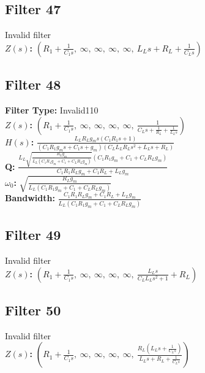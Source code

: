 \documentclass{article}
\begin{document}
\subsection*{Filter 47}
Invalid filter \\ 
\textbf{$Z(s)$:} $\left( R_{1} + \frac{1}{C_{1} s}, \  \infty, \  \infty, \  \infty, \  \infty, \  L_{L} s + R_{L} + \frac{1}{C_{L} s}\right)$ \\ 
\subsection*{Filter 48}
\textbf{Filter Type:} Invalid110 \\ 
\textbf{$Z(s)$:} $\left( R_{1} + \frac{1}{C_{1} s}, \  \infty, \  \infty, \  \infty, \  \infty, \  \frac{1}{C_{L} s + \frac{1}{R_{L}} + \frac{1}{L_{L} s}}\right)$ \\ 
\textbf{$H(s)$:} $\frac{L_{L} R_{L} g_{m} s \left(C_{1} R_{1} s + 1\right)}{\left(C_{1} R_{1} g_{m} s + C_{1} s + g_{m}\right) \left(C_{L} L_{L} R_{L} s^{2} + L_{L} s + R_{L}\right)}$ \\ 
\textbf{Q:} $\frac{L_{L} \sqrt{\frac{R_{L} g_{m}}{L_{L} \left(C_{1} R_{1} g_{m} + C_{1} + C_{L} R_{L} g_{m}\right)}} \left(C_{1} R_{1} g_{m} + C_{1} + C_{L} R_{L} g_{m}\right)}{C_{1} R_{1} R_{L} g_{m} + C_{1} R_{L} + L_{L} g_{m}}$ \\ 
\textbf{$\omega_0$:} $\sqrt{\frac{R_{L} g_{m}}{L_{L} \left(C_{1} R_{1} g_{m} + C_{1} + C_{L} R_{L} g_{m}\right)}}$ \\ 
\textbf{Bandwidth:} $\frac{C_{1} R_{1} R_{L} g_{m} + C_{1} R_{L} + L_{L} g_{m}}{L_{L} \left(C_{1} R_{1} g_{m} + C_{1} + C_{L} R_{L} g_{m}\right)}$ \\ 
\subsection*{Filter 49}
Invalid filter \\ 
\textbf{$Z(s)$:} $\left( R_{1} + \frac{1}{C_{1} s}, \  \infty, \  \infty, \  \infty, \  \infty, \  \frac{L_{L} s}{C_{L} L_{L} s^{2} + 1} + R_{L}\right)$ \\ 
\subsection*{Filter 50}
Invalid filter \\ 
\textbf{$Z(s)$:} $\left( R_{1} + \frac{1}{C_{1} s}, \  \infty, \  \infty, \  \infty, \  \infty, \  \frac{R_{L} \left(L_{L} s + \frac{1}{C_{L} s}\right)}{L_{L} s + R_{L} + \frac{1}{C_{L} s}}\right)$ \\ 
\end{document}
